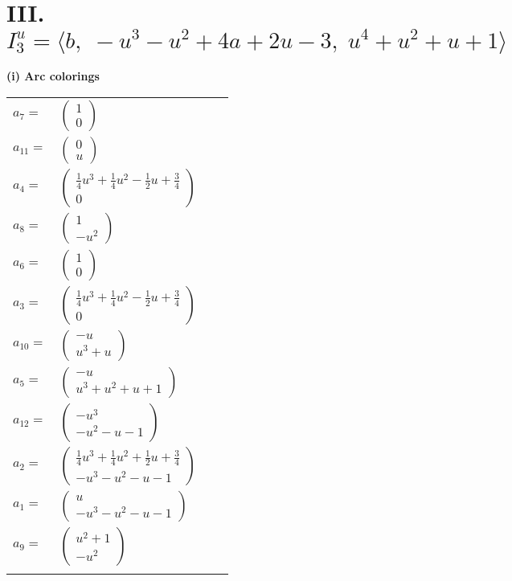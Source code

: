 \documentclass[1p]{elsarticle_modified}
\theoremstyle{definition}
\begin{document}
\centering \section*{III. $I^u_{3}= \langle b,\;- u^3- u^2+4 a+2 u-3,\;u^4+u^2+u+1 \rangle$}
\flushleft \textbf{(i) Arc colorings}\\
\begin{tabular}{m{7pt} m{180pt} m{7pt} m{180pt} }
\flushright $a_{7}=$&$\begin{pmatrix}1\\0\end{pmatrix}$ \\
\flushright $a_{11}=$&$\begin{pmatrix}0\\u\end{pmatrix}$ \\
\flushright $a_{4}=$&$\begin{pmatrix}\frac{1}{4} u^3+\frac{1}{4} u^2-\frac{1}{2} u+\frac{3}{4}\\0\end{pmatrix}$ \\
\flushright $a_{8}=$&$\begin{pmatrix}1\\- u^2\end{pmatrix}$ \\
\flushright $a_{6}=$&$\begin{pmatrix}1\\0\end{pmatrix}$ \\
\flushright $a_{3}=$&$\begin{pmatrix}\frac{1}{4} u^3+\frac{1}{4} u^2-\frac{1}{2} u+\frac{3}{4}\\0\end{pmatrix}$ \\
\flushright $a_{10}=$&$\begin{pmatrix}- u\\u^3+u\end{pmatrix}$ \\
\flushright $a_{5}=$&$\begin{pmatrix}- u\\u^3+u^2+u+1\end{pmatrix}$ \\
\flushright $a_{12}=$&$\begin{pmatrix}- u^3\\- u^2- u-1\end{pmatrix}$ \\
\flushright $a_{2}=$&$\begin{pmatrix}\frac{1}{4} u^3+\frac{1}{4} u^2+\frac{1}{2} u+\frac{3}{4}\\- u^3- u^2- u-1\end{pmatrix}$ \\
\flushright $a_{1}=$&$\begin{pmatrix}u\\- u^3- u^2- u-1\end{pmatrix}$ \\
\flushright $a_{9}=$&$\begin{pmatrix}u^2+1\\- u^2\end{pmatrix}$\\&\end{tabular}
\end{document}
